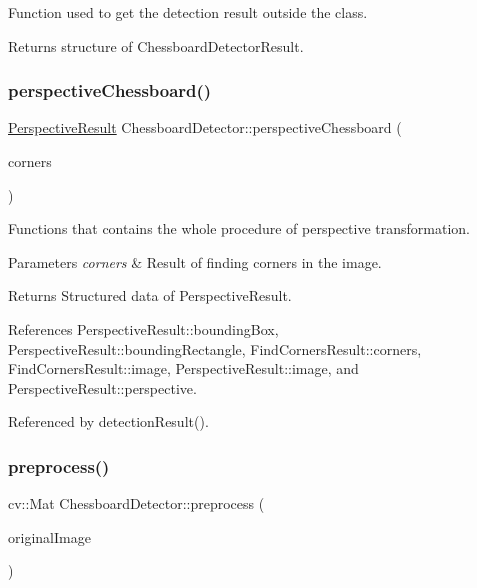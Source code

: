 Function used to get the detection result outside the class. 

\begin{DoxyReturn}{Returns}
structure of Chessboard\+Detector\+Result. 
\end{DoxyReturn}
\mbox{\label{classChessboardDetector_a591172112aeddde99db0f3dafda05b89}} 
\subsubsection{\texorpdfstring{perspective\+Chessboard()}{perspectiveChessboard()}}
{\footnotesize\ttfamily \hyperlink{structPerspectiveResult}{Perspective\+Result} Chessboard\+Detector\+::perspective\+Chessboard (\begin{DoxyParamCaption}\item[{\hyperlink{structFindCornersResult}{Find\+Corners\+Result}}]{corners }\end{DoxyParamCaption})}



Functions that contains the whole procedure of perspective transformation. 


\begin{DoxyParams}{Parameters}
{\em corners} & Result of finding corners in the image. \\
\hline
\end{DoxyParams}
\begin{DoxyReturn}{Returns}
Structured data of Perspective\+Result. 
\end{DoxyReturn}


References Perspective\+Result\+::bounding\+Box, Perspective\+Result\+::bounding\+Rectangle, Find\+Corners\+Result\+::corners, Find\+Corners\+Result\+::image, Perspective\+Result\+::image, and Perspective\+Result\+::perspective.



Referenced by detection\+Result().

\mbox{\label{classChessboardDetector_a5860832e43410d526daf7415e5775aa9}} 
\subsubsection{\texorpdfstring{preprocess()}{preprocess()}}
{\footnotesize\ttfamily cv\+::\+Mat Chessboard\+Detector\+::preprocess (\begin{DoxyParamCaption}\item[{cv\+::\+Mat}]{original\+Image }\end{DoxyParamCaption})}



